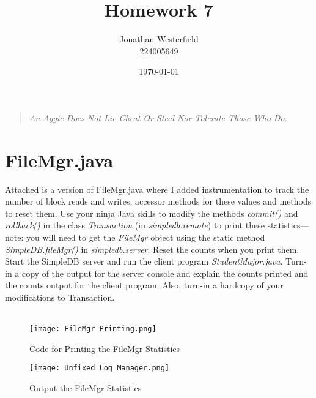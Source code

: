 \documentclass [letter,12pt] {article}
\begin{document}
\title{
    \huge{\textbf{Homework 7}}
}
\author{
    Jonathan Westerfield \\
    224005649
}
\date{\today}
\maketitle

\begin{quote}
\centering
\textit {
    An Aggie Does Not Lie Cheat Or Steal Nor Tolerate Those Who Do. \\
}
\vspace {1.4in}
\hrulefill
\end{quote}
\newpage

\section{FileMgr.java}
    Attached is a version of FileMgr.java where I added instrumentation 
    to track the number of block reads and writes, accessor methods for 
    these values and methods to reset them. Use your ninja Java skills 
    to modify the methods \textit{commit()} and \textit{rollback()} in 
    the class \textit{Transaction} 
    (in \textit{simpledb.remote}) to print these statistics—note: you will need to 
    get the \textit{FileMgr} object using the static method \textit{SimpleDB.fileMgr()} in
    \textit{simpledb.server}. Reset the counts when you print them. Start the 
    SimpleDB server and run the client program \textit{StudentMajor.java}. Turn-in
    a copy of the output for the server console and explain the counts 
    printed and the counts output for the client program. Also, turn-in a 
    hardcopy of your modifications to Transaction.
    \\
    \\
    \begin{figure}[htp]
        \centering
        \texttt{[image: FileMgr Printing.png]}
        \caption{Code for Printing the FileMgr Statistics}
        \label{fig:filemgrprint}
    \end{figure}

    \begin{figure}[htp]
        \centering
        \texttt{[image: Unfixed Log Manager.png]}
        \caption{Output the FileMgr Statistics}
        \label{fig:filemgroutput}
    \end{figure}
\end{document}
